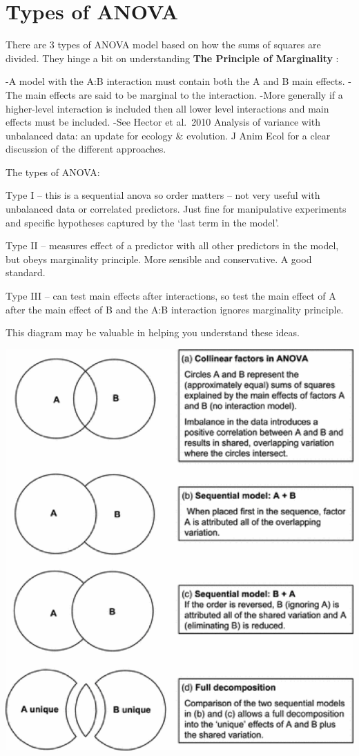 \documentclass[
]{book}
\begin{document}
\hypertarget{types-of-anova}{%
\section{Types of ANOVA}\label{types-of-anova}}

There are 3 types of ANOVA model based on how the sums of squares are divided. They hinge a bit on understanding \textbf{The Principle of Marginality }:

-A model with the A:B interaction must contain both the A and B main effects.
-The main effects are said to be marginal to the interaction.
-More generally if a higher-level interaction is included then all lower level interactions and main effects must be included.
-See Hector et al.~2010 Analysis of variance with unbalanced data: an update for ecology \& evolution. J Anim Ecol for a clear discussion of the different approaches.

The types of ANOVA:

Type I -- this is a sequential anova so order matters -- not very useful with unbalanced data or correlated predictors. Just fine for manipulative experiments and specific hypotheses captured by the `last term in the model'.

Type II -- measures effect of a predictor with all other predictors in the model, but obeys marginality principle. More sensible and conservative. A good standard.

Type III -- can test main effects after interactions, so test the main effect of A after the main effect of B and the A:B interaction ignores marginality principle.

This diagram may be valuable in helping you understand these ideas.

\includegraphics[width=10.22in]{images/VennModels}
\end{document}
